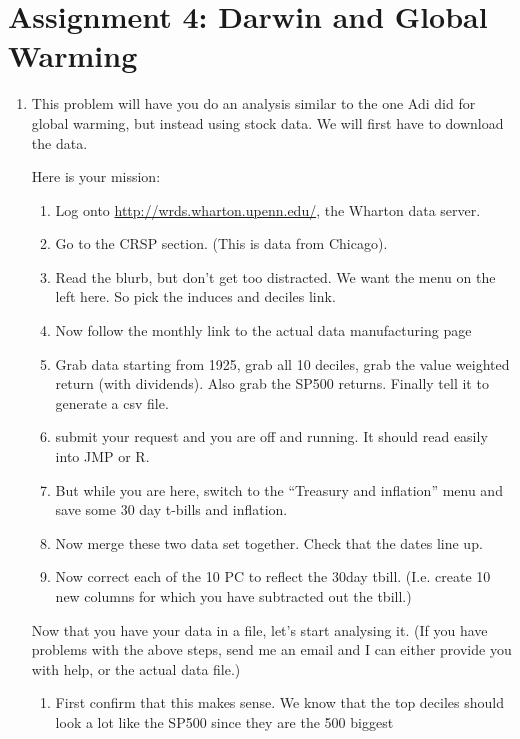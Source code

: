 \documentclass[11pt]{article}
\begin{document}
\section*{Assignment 4: Darwin and Global Warming}


\begin{enumerate}

\item This problem will have you do an analysis similar to the one Adi
did for global warming, but instead using stock data.  We will first
have to download the data.  

Here is your mission:
\begin{enumerate}[step 1:]
\item Log onto
\href{http://wrds.wharton.upenn.edu/}{http://wrds.wharton.upenn.edu/},
the Wharton data server.
\item Go to the CRSP section. (This is data from Chicago).
\item Read the blurb, but don't get too distracted.  We want the menu
on the left here.  So pick the induces and deciles link.
\item Now follow the monthly link to the actual data manufacturing page
\item Grab data starting from 1925, grab all 10 deciles, grab the
value weighted return (with dividends).  Also grab the SP500 returns.
Finally tell it to generate a csv file.
\item submit your request and you are off and running.  It should read
easily into JMP or R.
\item But while you are here, switch to the ``Treasury and inflation''
menu and save some 30 day t-bills and inflation.
\item Now merge these two data set together.  Check that the dates line up.
\item Now correct each of the 10 PC to reflect the 30day tbill.
(I.e. create 10 new columns for which you have subtracted out the tbill.)
\end{enumerate}
Now that you have your data in a file, let's start analysing it.  (If
you have problems with the above steps, send me an email and I can
either provide you with help, or the actual data file.)
\begin{enumerate}
\item First confirm that this makes sense.  We know that the top
deciles should look a lot like the SP500 since they are the 500 biggest

\end{enumerate}
\end{enumerate}
\end{document}
